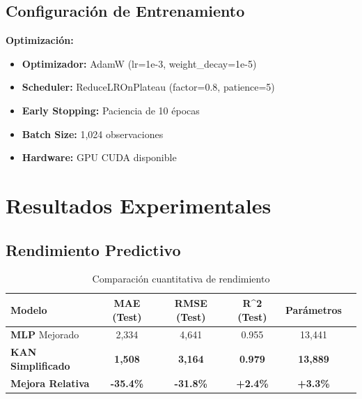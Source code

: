 \documentclass[10pt,twocolumn]{article}
\newcommand{\kan}{\textbf{KAN}}
\newcommand{\mlp}{\textbf{MLP}}
\newcommand{\rsquared}{R^2}
\begin{document}
\subsection{Configuración de Entrenamiento}

\textbf{Optimización:}
\begin{itemize}
    \item \textbf{Optimizador:} AdamW (lr=1e-3, weight\_decay=1e-5)
    \item \textbf{Scheduler:} ReduceLROnPlateau (factor=0.8, patience=5)
    \item \textbf{Early Stopping:} Paciencia de 10 épocas
    \item \textbf{Batch Size:} 1,024 observaciones
    \item \textbf{Hardware:} GPU CUDA disponible
\end{itemize}

\section{Resultados Experimentales}

\subsection{Rendimiento Predictivo}

\begin{table}[H]
\centering
\caption{Comparación cuantitativa de rendimiento}
\label{tab:performance}
\begin{tabular}{lccccc}
\toprule
\textbf{Modelo} & \textbf{MAE (Test)} & \textbf{RMSE (Test)} & \textbf{\rsquared{} (Test)} & \textbf{Parámetros} \\
\midrule
\mlp{} Mejorado & 2,334 & 4,641 & 0.955 & 13,441 \\
\textbf{\kan{} Simplificado} & \textbf{1,508} & \textbf{3,164} & \textbf{0.979} & \textbf{13,889} \\
\midrule
\textbf{Mejora Relativa} & \textbf{-35.4\%} & \textbf{-31.8\%} & \textbf{+2.4\%} & \textbf{+3.3\%} \\
\bottomrule
\end{tabular}
\end{table}
\end{document}
